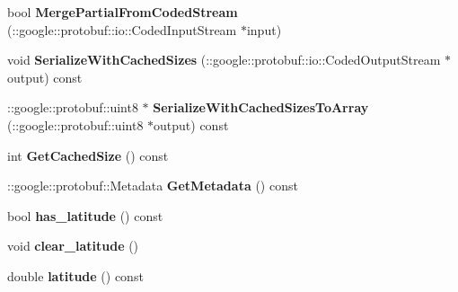 \begin{DoxyCompactItemize}
\item 
\hypertarget{classedcdatatypes_1_1_edc_payload___edc_position_ad1bba67d15a2087627084cb379a15247}{bool {\bfseries Merge\-Partial\-From\-Coded\-Stream} (\-::google\-::protobuf\-::io\-::\-Coded\-Input\-Stream $\ast$input)}\label{classedcdatatypes_1_1_edc_payload___edc_position_ad1bba67d15a2087627084cb379a15247}

\item 
\hypertarget{classedcdatatypes_1_1_edc_payload___edc_position_a36060618d730a4ccb1a4164df8c2ec9e}{void {\bfseries Serialize\-With\-Cached\-Sizes} (\-::google\-::protobuf\-::io\-::\-Coded\-Output\-Stream $\ast$output) const }\label{classedcdatatypes_1_1_edc_payload___edc_position_a36060618d730a4ccb1a4164df8c2ec9e}

\item 
\hypertarget{classedcdatatypes_1_1_edc_payload___edc_position_a0371724aadc24ba50e26f56bec8db710}{\-::google\-::protobuf\-::uint8 $\ast$ {\bfseries Serialize\-With\-Cached\-Sizes\-To\-Array} (\-::google\-::protobuf\-::uint8 $\ast$output) const }\label{classedcdatatypes_1_1_edc_payload___edc_position_a0371724aadc24ba50e26f56bec8db710}

\item 
\hypertarget{classedcdatatypes_1_1_edc_payload___edc_position_ace16514441958d3e271e468ca0fed414}{int {\bfseries Get\-Cached\-Size} () const }\label{classedcdatatypes_1_1_edc_payload___edc_position_ace16514441958d3e271e468ca0fed414}

\item 
\hypertarget{classedcdatatypes_1_1_edc_payload___edc_position_a9c5a29d8f20a4619c21de83f07281d76}{\-::google\-::protobuf\-::\-Metadata {\bfseries Get\-Metadata} () const }\label{classedcdatatypes_1_1_edc_payload___edc_position_a9c5a29d8f20a4619c21de83f07281d76}

\item 
\hypertarget{classedcdatatypes_1_1_edc_payload___edc_position_ab9c2c479f9f3e7dcc30d3fab0732feed}{bool {\bfseries has\-\_\-latitude} () const }\label{classedcdatatypes_1_1_edc_payload___edc_position_ab9c2c479f9f3e7dcc30d3fab0732feed}

\item 
\hypertarget{classedcdatatypes_1_1_edc_payload___edc_position_a0321592622a28c0976a459f54af8b486}{void {\bfseries clear\-\_\-latitude} ()}\label{classedcdatatypes_1_1_edc_payload___edc_position_a0321592622a28c0976a459f54af8b486}

\item 
\hypertarget{classedcdatatypes_1_1_edc_payload___edc_position_a82b7970d6ae5d762fab2b8a04969f16b}{double {\bfseries latitude} () const }\label{classedcdatatypes_1_1_edc_payload___edc_position_a82b7970d6ae5d762fab2b8a04969f16b}


\end{DoxyCompactItemize}
